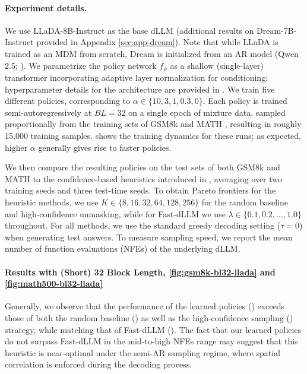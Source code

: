 \paragraph{Experiment details.} We use LLaDA-8B-Instruct \citep{llada2025} as the base dLLM (additional results on Dream-7B-Instruct \citep{ye2025dream} provided in Appendix \ref{sec:app-dream}). Note that while LLaDA is trained as an MDM from scratch, Dream is initialized from an AR model (Qwen 2.5; \citealt{qwen2025qwen25technicalreport}). We parametrize the policy network $f_{\phi}$ as a shallow (single-layer) transformer incorporating adaptive layer normalization for conditioning;
hyperparameter details for the architecture are provided in . We train five different policies, corresponding to $\alpha \in \{10, 3, 1, 0.3, 0\}$. Each policy is trained semi-autoregressively at $BL=32$ on a single epoch of mixture data, sampled proportionally from the training sets of GSM8k \citep{cobbe2021gsm8k} and MATH \citep{hendrycksmath2021}, resulting in roughly 15,000 training samples.  shows the training dynamics for these runs; as expected, higher $\alpha$ generally gives rise to faster policies.

We then compare the resulting policies on the test sets of both GSM8k and MATH to the confidence-based heuristics introduced in , averaging over two training seeds and three test-time seeds. To obtain Pareto frontiers for the heuristic methods, we use $K \in \{8, 16, 32,64,128, 256 \}$ for the random baseline and high-confidence unmasking, while for Fast-dLLM we use $\lambda \in \{0.1, 0.2, \ldots,1.0\}$ throughout. For all methods, we use the standard greedy decoding setting ($\tau = 0$) when generating test answers. To measure sampling speed, we report the mean number of function evaluations (NFEs) of the underlying dLLM.

\paragraph{Results with (Short) 32 Block Length, \autoref{fig:gsm8k-bl32-llada} and \autoref{fig:math500-bl32-llada}}
Generally, we observe that the performance of the learned policies (\greenline)
exceeds those of both the random baseline (\greyline) as well as the high-confidence sampling (\blueline) strategy,
while matching that of Fast-dLLM (\orangeline).
The fact that our learned policies do not surpass Fast-dLLM in the mid-to-high NFEs range may suggest that this heuristic is near-optimal under the semi-AR sampling regime, where spatial correlation is enforced during the decoding process.

